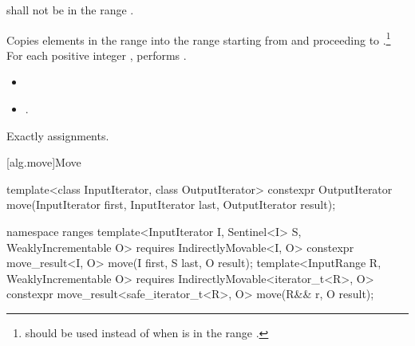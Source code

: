 \begin{itemdescr}
\pnum
\requires
{}
shall not be in the range
.

\pnum
\effects
Copies elements in the range 
into the
range 
starting from
and proceeding to .\footnote{
should be used instead of  when 
is in
the range
.}
For each positive integer
,
performs
.

\pnum
\returns
\begin{itemize}
\item {}
\item {}.
\end{itemize}

\pnum
\complexity
Exactly
assignments.
\end{itemdescr}

[alg.move]{Move}

%
\begin{itemdecl}
template<class InputIterator, class OutputIterator>
  constexpr OutputIterator move(InputIterator first, InputIterator last,
                                OutputIterator result);
\end{itemdecl}
\begin{addedblock}
%
\begin{itemdecl}
namespace ranges {
  template<InputIterator I, Sentinel<I> S, WeaklyIncrementable O>
    requires IndirectlyMovable<I, O>
    constexpr move_result<I, O>
      move(I first, S last, O result);
  template<InputRange R, WeaklyIncrementable O>
    requires IndirectlyMovable<iterator_t<R>, O>
    constexpr move_result<safe_iterator_t<R>, O>
      move(R&& r, O result);
}
\end{itemdecl}
\end{addedblock}

